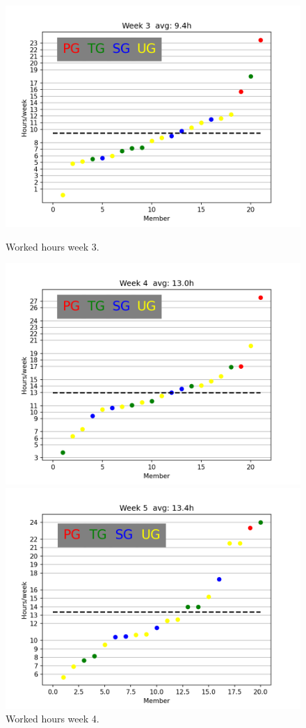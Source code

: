 \documentclass{article}
\begin{document}
        \begin{figure}[!htb]
              \includegraphics[width=\linewidth]{images/week_3.png}
              \caption{Worked hours week 3.}\label{fig:week3}
            \endminipage\hfill
              \includegraphics[width=\linewidth]{images/week_4.png}
              \caption{Worked hours week 4.}\label{fig:week4}
            \endminipage\hfill
              \includegraphics[width=\linewidth]{images/week_5.png}

\end{figure}
\end{document}
